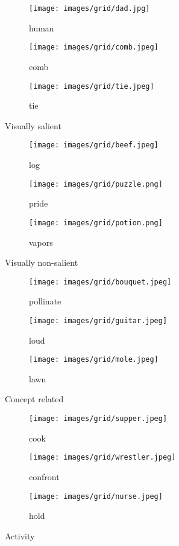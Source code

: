 \documentclass{article}
\begin{document}
\begin{figure}[ht] \begin{subfigure}{0.30\textwidth}
      \texttt{[image: images/grid/dad.jpg]}
      \caption{human}
  \end{subfigure}
\hfill \begin{subfigure}{0.30\textwidth}
      \texttt{[image: images/grid/comb.jpeg]}
      \caption{comb}
  \end{subfigure}
\hfill \begin{subfigure}{0.30\textwidth}
      \texttt{[image: images/grid/tie.jpeg]}
      \caption{tie}
  \end{subfigure}

  \caption{Visually salient}
      \label{fig:visually_salient}

  \begin{subfigure}{0.30\textwidth}
      \texttt{[image: images/grid/beef.jpeg]}
      \caption{log}
  \end{subfigure}
\hfill \begin{subfigure}{0.30\textwidth}
      \texttt{[image: images/grid/puzzle.png]}
      \caption{pride}
  \end{subfigure}
\hfill \begin{subfigure}{0.30\textwidth}
      \texttt{[image: images/grid/potion.png]}
      \caption{vapors}
  \end{subfigure}

  \caption{Visually non-salient}
     \label{fig:visually_non_salient}

  \begin{subfigure}{0.30\textwidth}
      \texttt{[image: images/grid/bouquet.jpeg]}
        \caption{pollinate}
  \end{subfigure}
\hfill \begin{subfigure}{0.30\textwidth}
      \texttt{[image: images/grid/guitar.jpeg]}
        \caption{loud}
  \end{subfigure}
\hfill \begin{subfigure}{0.30\textwidth}
      \texttt{[image: images/grid/mole.jpeg]}
        \caption{lawn}
  \end{subfigure}

  \caption{Concept related}
  \label{fig:grid_concept}
   
    \begin{subfigure}{0.30\textwidth}
      \texttt{[image: images/grid/supper.jpeg]}
      \caption{cook}
  \end{subfigure}
\hfill \begin{subfigure}{0.30\textwidth}
      \texttt{[image: images/grid/wrestler.jpeg]}
      \caption{confront}
  \end{subfigure}
\hfill \begin{subfigure}{0.30\textwidth}
      \texttt{[image: images/grid/nurse.jpeg]}
      \caption{hold}
  \end{subfigure}

  \caption{Activity}
  \label{fig:grid_activity}
  \end{figure}
\end{document}

